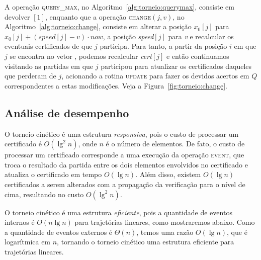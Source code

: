 



A operação \textsc{query\_max}, no Algoritmo~\ref{alg:torneio:querymax},
consiste em devolver \torneio$[1]$, enquanto que a operação \textsc{change}$(j, v)$, no
Algoritmo~\ref{alg:torneio:change}, consiste em alterar a posição $x_0[j]$ para ${x_0[j] +
(\mathit{speed}[j] - v)\cdot now}$, a posição \textit{speed}$[j]$ para \textit{v} e recalcular os
eventuais certificados de que $j$ participa.
Para tanto, a partir da posição $i$ em que $j$ se encontra no vetor \torneio, podemos recalcular
\textit{cert}$[j]$ e então continuamos visitando as partidas em que $j$ participou para atualizar
os certificados daqueles que perderam de $j$, acionando a rotina \textsc{update} para fazer os
devidos acertos em $Q$ correspondentes a estas modificações.
Veja a Figura~\ref{fig:torneio:change}.









\FloatBarrier

\subsection{Análise de desempenho}\label{subsec:torneio:analise-de-desempenho}

O torneio cinético é uma estrutura \textit{responsiva}, pois o custo de
processar um certificado é $O(\lg^2{n})$, onde $n$ é o número de elementos.
De fato, o custo de processar um certificado corresponde a uma execução da operação
\textsc{event}, que troca o resultado da partida entre os dois elementos envolvidos no certificado
e atualiza o certificado em tempo $O(\lg{n})$.
Além disso, existem $O(\lg{n})$ certificados a serem alterados com a propagação da verificação
para o nível de cima, resultando no custo $O(\lg^2{n})$.

O torneio cinético é uma estrutura \textit{eficiente}, pois a quantidade de eventos internos é
$O(n\lg{n})$ para trajetórias lineares, como mostraremos abaixo.
Como a quantidade de eventos externos é $\Theta(n)$, temos uma razão $O(\lg{n})$, que é logarítmica
em $n$, tornando o torneio cinético uma estrutura eficiente para trajetórias lineares.

